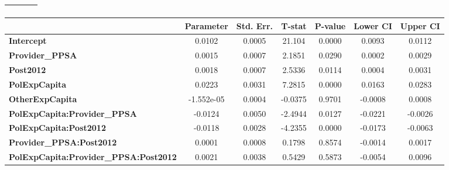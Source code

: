 \begin{center}
\begin{tabular}{lclc}
\textbf{}                                     &                    & \textbf{                     }   &                  \\
\bottomrule
\end{tabular}
\begin{tabular}{lcccccc}
                                              & \textbf{Parameter} & \textbf{Std. Err.} & \textbf{T-stat} & \textbf{P-value} & \textbf{Lower CI} & \textbf{Upper CI}  \\
\midrule
\textbf{Intercept}                            &       0.0102       &       0.0005       &      21.104     &      0.0000      &       0.0093      &       0.0112       \\
\textbf{Provider\_PPSA}                       &       0.0015       &       0.0007       &      2.1851     &      0.0290      &       0.0002      &       0.0029       \\
\textbf{Post2012}                             &       0.0018       &       0.0007       &      2.5336     &      0.0114      &       0.0004      &       0.0031       \\
\textbf{PolExpCapita}                         &       0.0223       &       0.0031       &      7.2815     &      0.0000      &       0.0163      &       0.0283       \\
\textbf{OtherExpCapita}                       &     -1.552e-05     &       0.0004       &     -0.0375     &      0.9701      &      -0.0008      &       0.0008       \\
\textbf{PolExpCapita:Provider\_PPSA}          &      -0.0124       &       0.0050       &     -2.4944     &      0.0127      &      -0.0221      &      -0.0026       \\
\textbf{PolExpCapita:Post2012}                &      -0.0118       &       0.0028       &     -4.2355     &      0.0000      &      -0.0173      &      -0.0063       \\
\textbf{Provider\_PPSA:Post2012}              &       0.0001       &       0.0008       &      0.1798     &      0.8574      &      -0.0014      &       0.0017       \\
\textbf{PolExpCapita:Provider\_PPSA:Post2012} &       0.0021       &       0.0038       &      0.5429     &      0.5873      &      -0.0054      &       0.0096       \\
\bottomrule
\end{tabular}
\end{center}